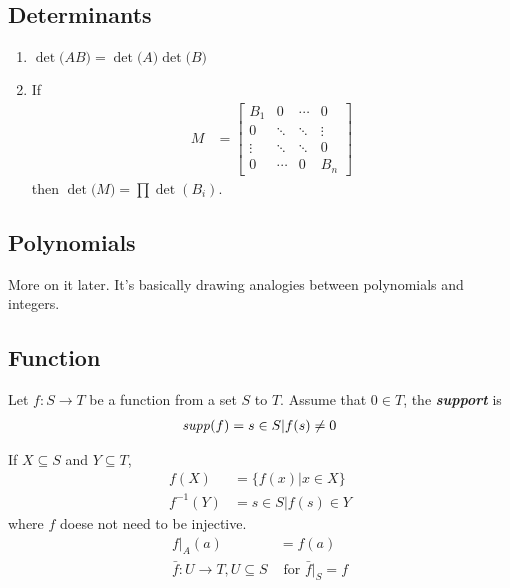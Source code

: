 \documentclass[../main.tex]{subfiles}
\begin{document}
\subsection*{Determinants}
\begin{enumerate}[label = \arabic*.]
    \item $\det\bigl(AB\bigr) = \det\bigl(A\bigr)\det\bigl(B\bigr)$
    \item If 
        \begin{align*}
            M &= \begin{bmatrix}
                B_1 & 0 & \cdots & 0 \\
                0 & \ddots & \ddots & \vdots \\
                \vdots & \ddots & \ddots & 0 \\
                0 & \cdots & 0 & B_n
            \end{bmatrix}
        \end{align*}
        then $\det\bigl(M\bigr) = \prod \det(B_i)$.
\end{enumerate}

\subsection*{Polynomials}
More on it later.
It's basically drawing analogies between polynomials and integers.

\subsection*{Function}
\begin{definition}
    Let $f:S \to T$ be a function from a set $S$ to $T$. Assume that $0 \in T$, the 
    \emph{\textbf{support}} is 
    \begin{align*}
        \text{\emph{supp}}(f) = {s \in S | f(s) \neq 0}
    \end{align*}
\end{definition}

If $X \subseteq S$ and $Y \subseteq T$, 
\begin{align*}
    f(X) &= \{f(x) | x \in X\} \\
    f^{-1}(Y) &= {s \in S | f(s) \in Y}
\end{align*}
where $f$ doese not need to be injective.
\begin{align*}
    f|_A(a) &= f(a) \\
    \bar{f}: U \to T, U \subseteq S &\text{ for } \bar{f}|_S = f
\end{align*}
\end{document}
